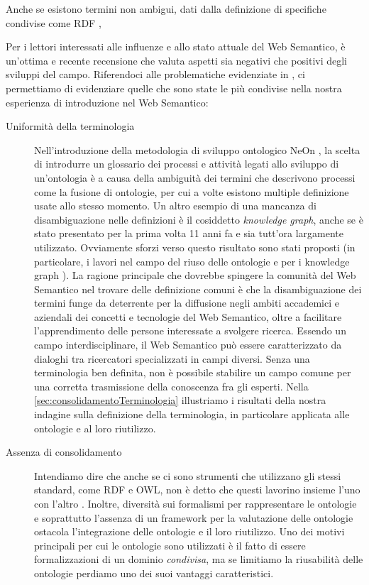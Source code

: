 Anche se esistono termini non ambigui, dati dalla definizione di specifiche condivise come RDF \cite{RDFspecification}, 

Per i lettori interessati alle influenze e allo stato attuale del Web Semantico, \cite{hitzler2021review} è un'ottima e recente recensione che valuta aspetti sia negativi che positivi degli sviluppi del campo. Riferendoci alle problematiche evidenziate in \cite{hitzler2021review}, ci permettiamo di evidenziare quelle che sono state le più condivise nella nostra esperienza di introduzione nel Web Semantico:
\begin{description}
	\item[Uniformità della terminologia] Nell'introduzione della metodologia di sviluppo ontologico NeOn \cite{NeOn}, la scelta di introdurre un glossario dei processi e attività legati allo sviluppo di un'ontologia è a causa della ambiguità dei termini che descrivono processi come la fusione di ontologie, per cui a volte esistono multiple definizione usate allo stesso momento. Un altro esempio di una mancanza di disambiguazione nelle definizioni è il cosiddetto \textit{knowledge graph}, anche se è stato presentato per la prima volta 11 anni fa e sia tutt'ora largamente utilizzato. Ovviamente sforzi verso questo risultato sono stati proposti (in particolare, i lavori \cite{katsumi2018ontology, goy2015ontologies, NeOn} nel campo del riuso delle ontologie  e per i knowledge graph \cite{ehrlinger2016towards}). La ragione principale che dovrebbe spingere la comunità del Web Semantico nel trovare delle definizione comuni è che la disambiguazione dei termini funge da deterrente per la diffusione negli ambiti accademici e aziendali dei concetti e tecnologie del Web Semantico, oltre a facilitare l'apprendimento delle persone interessate a svolgere ricerca. Essendo un campo interdisciplinare, il Web Semantico può essere caratterizzato da dialoghi tra ricercatori specializzati in campi diversi. Senza una terminologia ben definita, non è possibile stabilire un campo comune per una corretta trasmissione della conoscenza fra gli esperti. Nella \autoref{sec:consolidamentoTerminologia} illustriamo i risultati della nostra indagine sulla definizione della terminologia, in particolare applicata alle ontologie e al loro riutilizzo.
	
	\item[Assenza di consolidamento] Intendiamo dire che anche se ci sono strumenti che utilizzano gli stessi standard, come RDF e OWL, non è detto che questi lavorino insieme l'uno con l'altro \cite{hitzler2021review}. Inoltre, diversità sui formalismi per rappresentare le ontologie e soprattutto l'assenza di un framework per la valutazione delle ontologie ostacola l'integrazione delle ontologie e il loro riutilizzo. Uno dei motivi principali per cui le ontologie sono utilizzati è il fatto di essere formalizzazioni di un dominio \textit{condivisa}, ma se limitiamo la riusabilità delle ontologie perdiamo uno dei suoi vantaggi caratteristici.
	

\end{description}
